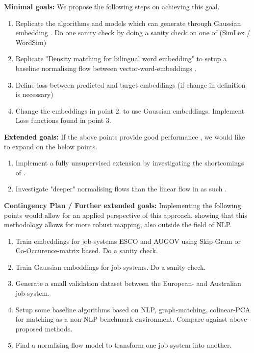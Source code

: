\documentclass[a4paper,12pt,twoside,openright]{report}
\begin{document}
\textbf{Minimal goals:} We propose the following steps on achieving this goal.


\begin{enumerate}
    \item Replicate the algorithms and models which can generate through Gaussian embedding \cite{gaussian_embedding}. Do one sanity check by doing a sanity check on one of (SimLex / WordSim)
    \item Replicate "Density matching for bilingual word embedding" to setup a baseline normalising flow between vector-word-embeddings \cite{density_matching}.
    \item Define loss between predicted and target embeddings (if change in definition is necessary)
    \item Change the embeddings in point 2. to use Gaussian embeddings. Implement Loss functions found in point 3.
\end{enumerate}

\textbf{Extended goals:} If the above points provide good performance , we would like to expand on the below points.

\begin{enumerate}
    \item Implement a fully unsupervised extension by investigating the shortcomings of \cite{density_matching}.
    \item Investigate "deeper" normalising flows than the linear flow in \cite{density_matching} as such \cite{flowpp} \cite{neuralsplineflow}.
\end{enumerate}


\textbf{Contingency Plan / Further extended goals:} Implementing the following points would allow for an applied perspective of this approach, showing that this methodology allows for more robust mapping, also outside the field of NLP.


\begin{enumerate}
    \item Train embeddings for job-systems ESCO and AUGOV using Skip-Gram or Co-Occurence-matrix based. Do a sanity check.
    \item Train Gaussian embeddings for job-systems. Do a sanity check.
    \item Generate a small validation dataset between the European- and Australian job-system.
    \item Setup some baseline algorithms based on NLP, graph-matching, colinear-PCA for matching as a non-NLP benchmark environment. Compare against above-proposed methods.
    \item Find a normlising flow model to transform one job system into another.
\end{enumerate}
\end{document}
